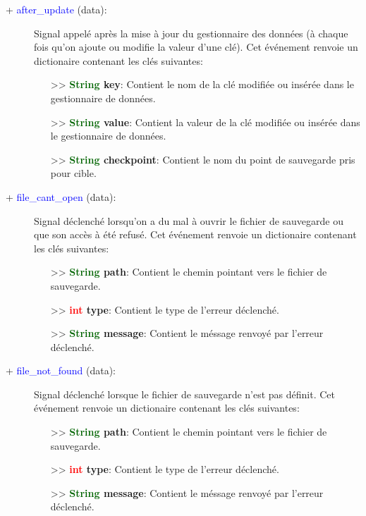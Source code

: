 \documentclass[a4paper, 11pt]{article}
\begin{document}
	\begin{description}
		\item [+ \textcolor{blue}{after\_update} (data):] Signal appelé après la mise à jour du gestionnaire 
		des données (à chaque fois qu'on ajoute ou modifie la valeur d'une clé). Cet événement renvoie un
		dictionaire contenant les clés suivantes:
		\begin{itemize}
			\item [>> \textbf{\textcolor{darkgreen}{String} key}:] Contient le nom de la clé modifiée ou
			insérée dans le gestionnaire de données.
			\item [>> \textbf{\textcolor{darkgreen}{String} value}:] Contient la valeur de la clé modifiée
			ou insérée dans le gestionnaire de données.
			\item [>> \textbf{\textcolor{darkgreen}{String} checkpoint}:] Contient le nom du point de
			sauvegarde pris pour cible.\\
		\end{itemize}
	\end{description}
	\begin{description}
		\item [+ \textcolor{blue}{file\_cant\_open} (data):] Signal déclenché lorsqu'on a du mal à ouvrir
		le fichier de sauvegarde ou que son accès à été refusé. Cet événement renvoie un dictionaire
		contenant les clés suivantes:
		\begin{itemize}
			\item [>> \textbf{\textcolor{darkgreen}{String} path}:] Contient le chemin pointant vers le
			fichier de sauvegarde.
			\item [>> \textbf{\textcolor{red}{int} type}:] Contient le type de l'erreur déclenché.
			\item [>> \textbf{\textcolor{darkgreen}{String} message}:] Contient le méssage renvoyé par 
			l'erreur déclenché.\\
		\end{itemize}
	\end{description}
	\begin{description}
		\item [+ \textcolor{blue}{file\_not\_found} (data):] Signal déclenché lorsque le fichier de 
		sauvegarde n'est pas définit. Cet événement renvoie un dictionaire contenant les clés suivantes:
		\begin{itemize}
			\item [>> \textbf{\textcolor{darkgreen}{String} path}:] Contient le chemin pointant vers le
			fichier de sauvegarde.
			\item [>> \textbf{\textcolor{red}{int} type}:] Contient le type de l'erreur déclenché.
			\item [>> \textbf{\textcolor{darkgreen}{String} message}:] Contient le méssage renvoyé par 
			l'erreur déclenché.\\
		\end{itemize}
	\end{description}
\end{document}
